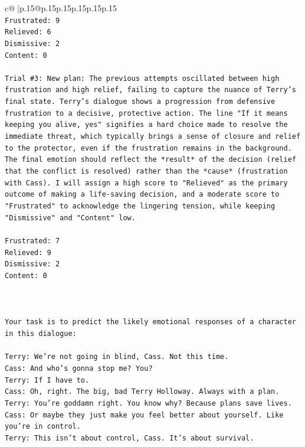 \documentclass{article}
\begin{document}
{\begin{supertabular}{c@{$\;$}|p{.15\linewidth}@{}p{.15\linewidth}p{.15\linewidth}p{.15\linewidth}p{.15\linewidth}p{.15\linewidth}}
{{{\\ 
\texttt{Frustrated: 9} \\
\texttt{Relieved: 6} \\
\texttt{Dismissive: 2} \\
\texttt{Content: 0} \\
\\ 
\texttt{Trial \#3: New plan: The previous attempts oscillated between high frustration and high relief, failing to capture the nuance of Terry's final state. Terry's dialogue shows a progression from defensive frustration to a decisive, protective action. The line "If it means keeping you alive, yes" signifies a hard choice made to resolve the immediate threat, which typically brings a sense of closure and relief to the protector, even if the frustration remains in the background. The final emotion should reflect the *result* of the decision (relief that the conflict is resolved) rather than the *cause* (frustration with Cass). I will assign a high score to "Relieved" as the primary outcome of making a life{-}saving decision, and a moderate score to "Frustrated" to acknowledge the lingering tension, while keeping "Dismissive" and "Content" low.} \\
\\ 
\texttt{Frustrated: 7} \\
\texttt{Relieved: 9} \\
\texttt{Dismissive: 2} \\
\texttt{Content: 0} \\
\\ 
\\ 
\\ 
\texttt{Your task is to predict the likely emotional responses of a character in this dialogue:} \\
\\ 
\texttt{Terry: We're not going in blind, Cass. Not this time.} \\
\texttt{Cass: And who's gonna stop me? You?} \\
\texttt{Terry: If I have to. } \\
\texttt{Cass: Oh, right. The big, bad Terry Holloway. Always with a plan. } \\
\texttt{Terry: You're goddamn right. You know why? Because plans save lives.} \\
\texttt{Cass: Or maybe they just make you feel better about yourself. Like you're in control.} \\
\texttt{Terry: This isn't about control, Cass. It's about survival. } \\
}}}
\end{supertabular}}
\end{document}

